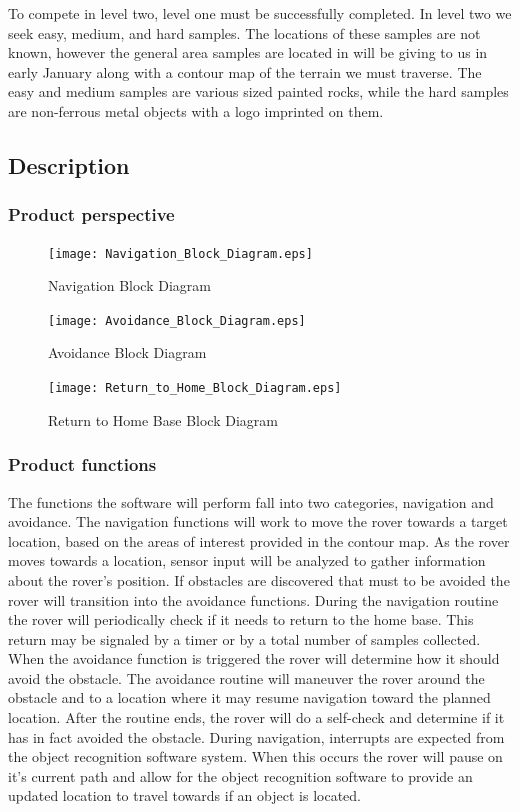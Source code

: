 \documentclass[10pt, oneside,onecolumn]{IEEEtran}
\begin{document}
\begin{titlepage}
To compete in level two, level one must be successfully completed. In level two we seek easy, medium, and hard samples. The locations of these samples are not known, however the general area samples are located in will be giving to us in early January along with a contour map of the terrain we must traverse. The easy and medium samples are various sized painted rocks, while the hard samples are non-ferrous metal objects with a logo imprinted on them. 

\subsection{Description}
\subsubsection{Product perspective}

\begin{figure}[H]
\centering
\texttt{[image: Navigation\_Block\_Diagram.eps]}
\caption{Navigation Block Diagram}
\end{figure}

\begin{figure}[H]
\centering
\texttt{[image: Avoidance\_Block\_Diagram.eps]}
\caption{Avoidance Block Diagram}
\end{figure}

\begin{figure}[H]
\centering
\texttt{[image: Return\_to\_Home\_Block\_Diagram.eps]}
\caption{Return to Home Base Block Diagram}
\end{figure}

\subsubsection{Product functions}
	The functions the software will perform fall into two categories, navigation and avoidance. The navigation functions will work to move the rover towards a target location, based on the areas of interest provided in the contour map. As the rover moves towards a location, sensor input will be analyzed to gather information about the rover's position. If obstacles are discovered that must to be avoided the rover will transition into the avoidance functions. During the navigation routine the rover will periodically check if it needs to return to the home base. This return may be signaled by a timer or by a total number of samples collected.  
	When the avoidance function is triggered the rover will determine how it should avoid the obstacle. The avoidance routine will maneuver the rover around the obstacle and to a location where it may resume navigation toward the planned location. After the routine ends, the rover will do a self-check and determine if it has in fact avoided the obstacle. During navigation, interrupts are expected from the object recognition software system. When this occurs the rover will pause on it's current path and allow for the object recognition software to provide an updated location to travel towards if an object is located. 


\end{titlepage}
\end{document}
